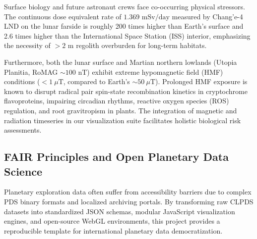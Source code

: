 Surface biology and future astronaut crews face co-occurring physical stressors. The continuous dose equivalent rate of $1.369\text{ mSv/day}$ measured by Chang'e-4 LND on the lunar farside is roughly 200 times higher than Earth's surface and 2.6 times higher than the International Space Station (ISS) interior, emphasizing the necessity of $>2\text{ m}$ regolith overburden for long-term habitats.

Furthermore, both the lunar surface and Martian northern lowlands (Utopia Planitia, RoMAG $\sim 100\text{ nT}$) exhibit extreme hypomagnetic field (HMF) conditions ($< 1~\mu\text{T}$, compared to Earth's $\sim 50~\mu\text{T}$). Prolonged HMF exposure is known to disrupt radical pair spin-state recombination kinetics in cryptochrome flavoproteins, impairing circadian rhythms, reactive oxygen species (ROS) regulation, and root gravitropism in plants. The integration of magnetic and radiation timeseries in our visualization suite facilitates holistic biological risk assessments.

\subsection{FAIR Principles and Open Planetary Data Science}

Planetary exploration data often suffer from accessibility barriers due to complex PDS binary formats and localized archiving portals. By transforming raw CLPDS datasets into standardized JSON schemas, modular JavaScript visualization engines, and open-source WebGL environments, this project provides a reproducible template for international planetary data democratization.
